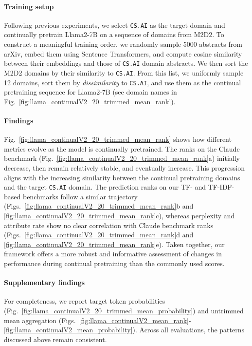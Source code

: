 \documentclass[10pt]{article}
\newcommand{\revision}[1]{\textcolor{black}{#1}}
\begin{document}
\paragraph{Training setup}
Following previous experiments, we select \texttt{CS.AI} as the target domain and continually pretrain Llama2-7B on a sequence of domains from M2D2. 
To construct a meaningful training order, we randomly sample $5000$ abstracts from arXiv, embed them using Sentence Transformers, and compute cosine similarity between their embeddings and those of \texttt{CS.AI} domain abstracts. We then sort the M2D2 domains by their similarity to \texttt{CS.AI}. From this list, we uniformly sample 12 domains, sort them by \textit{dissimilarity} to \texttt{CS.AI}, and use them as the continual pretraining sequence for Llama2-7B (see domain names in Fig.~\ref{fig:llama_continualV2_20_trimmed_mean_rank}).

\paragraph{Findings}
Fig.~\ref{fig:llama_continualV2_20_trimmed_mean_rank} shows how different metrics evolve as the model is continually pretrained. The ranks on the \revision{Claude} benchmark (Fig.~\ref{fig:llama_continualV2_20_trimmed_mean_rank}a) initially decrease, then remain relatively stable, and eventually increase. This progression aligns with the increasing similarity between the continual pretraining domains and the target \texttt{CS.AI} domain. The prediction ranks on our TF- and TF-IDF-based benchmarks follow a similar trajectory (Figs.~\ref{fig:llama_continualV2_20_trimmed_mean_rank}b and \ref{fig:llama_continualV2_20_trimmed_mean_rank}c), whereas perplexity and attribute rate show no clear correlation with \revision{Claude} benchmark ranks (Figs.~\ref{fig:llama_continualV2_20_trimmed_mean_rank}d and \ref{fig:llama_continualV2_20_trimmed_mean_rank}e). Taken together, our framework offers a more robust and informative assessment of changes in performance during continual pretraining than the commonly used scores.

\paragraph{Supplementary findings}
For completeness, we report target token probabilities (Fig.~\ref{fig:llama_continualV2_20_trimmed_mean_probability}) and untrimmed mean aggregation (Figs.~\ref{fig:llama_continualV2_mean_rank}-
\ref{fig:llama_continualV2_mean_probability}). Across all evaluations, the patterns discussed above remain consistent.  
\end{document}
